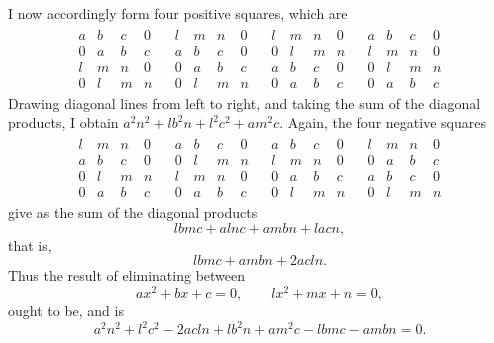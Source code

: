 \documentclass[11pt]{article}
\begin{document}
I now accordingly form four positive squares, which are
\[
\begin{array}{cccc}
\begin{array}{cccc}a&b&c&0\\0&a&b&c\\l&m&n&0\\0&l&m&n\end{array}&
\begin{array}{cccc}l&m&n&0\\a&b&c&0\\0&a&b&c\\0&l&m&n\end{array}&
\begin{array}{cccc}l&m&n&0\\0&l&m&n\\a&b&c&0\\0&a&b&c\end{array}&
\begin{array}{cccc}a&b&c&0\\l&m&n&0\\0&l&m&n\\0&a&b&c\end{array}
\end{array}
\]
Drawing diagonal lines from left to right, and taking the sum of the diagonal products, I obtain $a^2n^2+lb^2n+l^2c^2+am^2c$. Again, the four negative squares
\[
\begin{array}{cccc}
\begin{array}{cccc}l&m&n&0\\a&b&c&0\\0&l&m&n\\0&a&b&c\end{array}&
\begin{array}{cccc}a&b&c&0\\0&l&m&n\\l&m&n&0\\0&a&b&c\end{array}&
\begin{array}{cccc}a&b&c&0\\l&m&n&0\\0&a&b&c\\0&l&m&n\end{array}&
\begin{array}{cccc}l&m&n&0\\0&a&b&c\\a&b&c&0\\0&l&m&n\end{array}
\end{array}
\]
give as the sum of the diagonal products
\[
 lbmc+alnc+ambn+lacn,
\]
that is,
\[
 lbmc+ambn+2acln.
\]
Thus the result of eliminating between
\[
 ax^2+bx+c=0,
\qquad
 lx^2+mx+n=0,
\]
ought to be, and is
\[
 a^2n^2+l^2c^2-2acln+lb^2n+am^2c-lbmc-ambn=0.
\]
\end{document}
